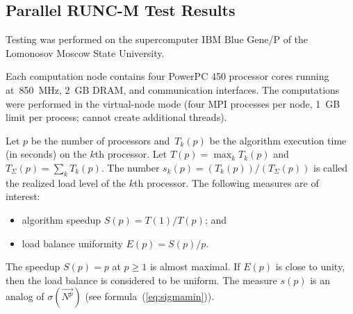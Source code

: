 \begin{multicols}{2}
\section{Parallel RUNC-M Test Results}

\noindent
Testing was performed on the supercomputer IBM Blue Gene/P of the
Lomonosov Moscow State University.

Each computation node contains four PowerPC 450 processor cores
running at~850~MHz, 2~GB DRAM, and communication interfaces.
The computations were performed in the virtual-node mode (four MPI
processes per node, 1~GB limit per process; cannot create
additional threads).

Let $p$ be the number of processors and~$T_k(p)$ be the algorithm
execution time (in seconds) on the $k$th processor. Let
$T(p)=\max_k T_k(p)$ and $T_\Sigma(p)=\sum_k T_k(p)$. The number
$s_k(p)=(T_k(p)) /(T_\Sigma(p) )$ is called the realized load
level of the $k$th processor. The following measures are of
interest:
\begin{itemize}
    \item
    algorithm speedup $S(p)=T(1)/T(p)$; and
    \item
    load balance uniformity $E(p)=S(p)/p$.
\end{itemize}

The speedup $S(p)=p$ at $p\geq 1$ is almost maximal. If $E(p)$ is
close to unity, then the load balance is considered to be uniform.
The measure $s(p)$ is an analog of $\sigma(\vec{N^p})$ (see formula~(\ref{eq:sigmamin})).

\begin{table*}\small %
\begin{center}
    \label{tab:results2}
\vspace*{2ex}


\end{center}
\end{table*}
\end{multicols}
